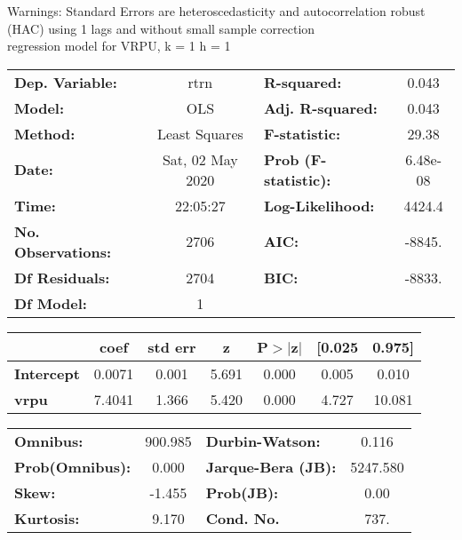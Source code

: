 Warnings: \newline
 [1] Standard Errors are heteroscedasticity and autocorrelation robust (HAC) using 1 lags and without small sample correction\\ 

regression model for VRPU, k = 1 h = 1\begin{center}
\begin{tabular}{lclc}
\toprule
\textbf{Dep. Variable:}    &       rtrn       & \textbf{  R-squared:         } &     0.043   \\
\textbf{Model:}            &       OLS        & \textbf{  Adj. R-squared:    } &     0.043   \\
\textbf{Method:}           &  Least Squares   & \textbf{  F-statistic:       } &     29.38   \\
\textbf{Date:}             & Sat, 02 May 2020 & \textbf{  Prob (F-statistic):} &  6.48e-08   \\
\textbf{Time:}             &     22:05:27     & \textbf{  Log-Likelihood:    } &    4424.4   \\
\textbf{No. Observations:} &        2706      & \textbf{  AIC:               } &    -8845.   \\
\textbf{Df Residuals:}     &        2704      & \textbf{  BIC:               } &    -8833.   \\
\textbf{Df Model:}         &           1      & \textbf{                     } &             \\
\bottomrule
\end{tabular}
\begin{tabular}{lcccccc}
                   & \textbf{coef} & \textbf{std err} & \textbf{z} & \textbf{P$> |$z$|$} & \textbf{[0.025} & \textbf{0.975]}  \\
\midrule
\textbf{Intercept} &       0.0071  &        0.001     &     5.691  &         0.000        &        0.005    &        0.010     \\
\textbf{vrpu}      &       7.4041  &        1.366     &     5.420  &         0.000        &        4.727    &       10.081     \\
\bottomrule
\end{tabular}
\begin{tabular}{lclc}
\textbf{Omnibus:}       & 900.985 & \textbf{  Durbin-Watson:     } &    0.116  \\
\textbf{Prob(Omnibus):} &   0.000 & \textbf{  Jarque-Bera (JB):  } & 5247.580  \\
\textbf{Skew:}          &  -1.455 & \textbf{  Prob(JB):          } &     0.00  \\
\textbf{Kurtosis:}      &   9.170 & \textbf{  Cond. No.          } &     737.  \\
\bottomrule
\end{tabular}
\end{center}


